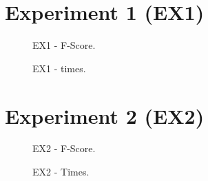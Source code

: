\begin{apendicesenv}

\partapendices



\chapter{Experiment 1 (EX1)}

\begin{figure}
    \centering
    
    \caption{EX1 - F-Score.}
    \label{fig:ex1FScore}
\end{figure}

\newpage

\begin{figure}
    \centering
    
    \caption{EX1 - times.}
    \label{fig:ex1Times}
\end{figure}

\chapter{Experiment 2 (EX2)}

\begin{figure}
    \centering
    
    \caption{EX2 - F-Score.}
    \label{fig:ex2FScore}
\end{figure}

\newpage

\begin{figure}
    \centering
    
    \caption{EX2 - Times.}
    \label{fig:ex2Times}
\end{figure}


\end{apendicesenv}
